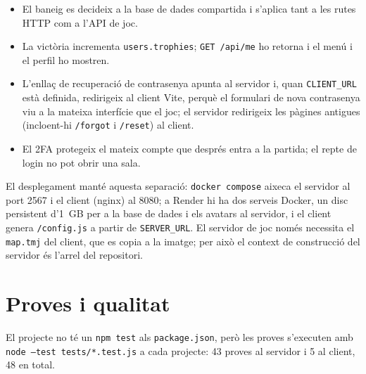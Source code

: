 \documentclass[11pt,a4paper]{article}
\begin{document}
\begin{itemize}
  \item El baneig es decideix a la base de dades compartida i s'aplica tant a les rutes
        HTTP com a l'API de joc.
  \item La victòria incrementa \texttt{users.trophies}; \texttt{GET /api/me} ho
        retorna i el menú i el perfil ho mostren.
  \item L'enllaç de recuperació de contrasenya apunta al servidor i, quan
        \texttt{CLIENT\_URL} està definida, redirigeix al client Vite, perquè el
        formulari de nova contrasenya viu a la mateixa interfície que el joc; el
        servidor redirigeix les pàgines antigues (incloent-hi \texttt{/forgot} i
        \texttt{/reset}) al client.
  \item El 2FA protegeix el mateix compte que després entra a la partida; el repte de
        login no pot obrir una sala.
\end{itemize}

El desplegament manté aquesta separació: \texttt{docker compose} aixeca el servidor al
port 2567 i el client (nginx) al 8080; a Render hi ha dos serveis Docker, un disc
persistent d'1~GB per a la base de dades i els avatars al servidor, i el client genera
\texttt{/config.js} a partir de \texttt{SERVER\_URL}. El servidor de joc només
necessita el \texttt{map.tmj} del client, que es copia a la imatge; per això el context
de construcció del servidor és l'arrel del repositori.

\section{Proves i qualitat}
\label{sec:qualitat}

El projecte no té un \texttt{npm test} als \texttt{package.json}, però les proves
s'executen amb \texttt{node --test tests/*.test.js} a cada projecte: 43 proves al
servidor i 5 al client, 48 en total.
\end{document}
